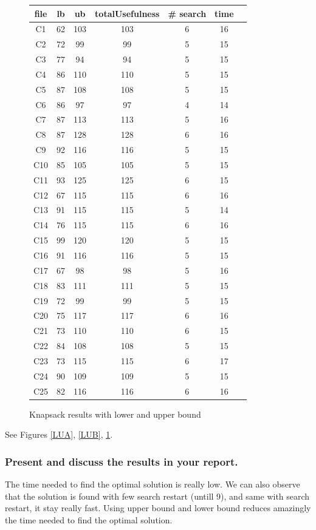 \documentclass[a4paper ,12pt,french]{article}
\begin{document}
\begin{figure}[!h]
\begin{tabular}{|c|c|c|c|c|c|c|}
\hline
file&lb&ub&totalUsefulness&\# search&time\\
\hline
\hline
C1&62&103&103&6&16\\ \hline
C2&72&99&99&5&15\\ \hline
C3&77&94&94&5&15\\ \hline
C4&86&110&110&5&15\\ \hline
C5&87&108&108&5&15\\ \hline
C6&86&97&97&4&14\\ \hline
C7&87&113&113&5&16\\ \hline
C8&87&128&128&6&16\\ \hline
C9&92&116&116&5&15\\ \hline
C10&85&105&105&5&15\\ \hline
C11&93&125&125&6&15\\ \hline
C12&67&115&115&6&16\\ \hline
C13&91&115&115&5&14\\ \hline
C14&76&115&115&6&16\\ \hline
C15&99&120&120&5&15\\ \hline
C16&91&116&116&5&15\\ \hline
C17&67&98&98&5&16\\ \hline
C18&83&111&111&5&15\\ \hline
C19&72&99&99&5&15\\ \hline
C20&75&117&117&6&16\\ \hline
C21&73&110&110&6&15\\ \hline
C22&84&108&108&5&15\\ \hline
C23&73&115&115&6&17\\ \hline
C24&90&109&109&5&15\\ \hline
C25&82&116&116&6&16\\ \hline
\end{tabular}
\caption{Knapsack results with lower and upper bound}
\label{LUC}
\end{figure}


See Figures \ref{LUA}, \ref{LUB}, \ref{LUC}.

\subsubsection{Present and discuss the results in your report.}

The time needed to find the optimal solution is really low. We can also observe that the solution is found with few search restart (untill 9), and same with search restart, it stay really fast. Using upper bound and lower bound reduces amazingly the time needed to find the optimal solution. 
\end{document}
